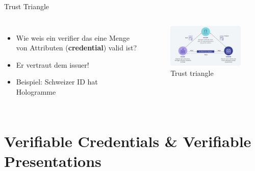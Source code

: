\documentclass[
	ngerman,%
	authorontitle=true,
	]{bfhbeamer}
\begin{document}
\begin{frame}{Trust Triangle}
    \begin{columns}[onlytextwidth,T]
        \column{70mm}  
        \begin{itemize}
            \item Wie weis ein verifier das eine Menge von Attributen (\textbf{credential}) valid ist?
            \item Er vertraut dem issuer!
            \item Beispiel: Schweizer ID hat Hologramme
        \end{itemize}

        \column{70mm}

        \begin{figure}
            \centering
            \includegraphics[width=70mm]{../img/trusttriangle.png}
            \caption{Trust triangle}
        \end{figure}
        
    \end{columns}
\end{frame}



\section{Verifiable Credentials \& Verifiable Presentations}
\end{document}
